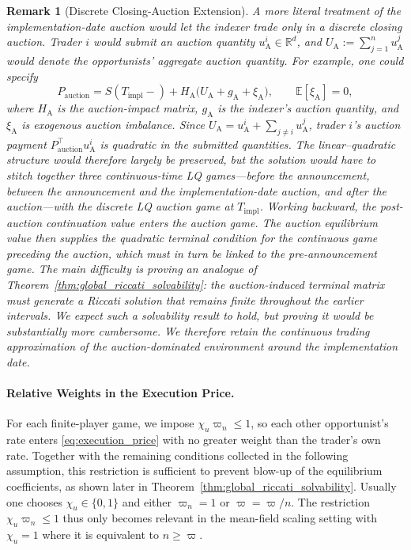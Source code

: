 \documentclass[12pt]{article}
\numberwithin{equation}{section}
\newtheorem{remark}[theorem]{Remark}
\theoremstyle{definition}
\begin{document}
\begin{remark}[Discrete Closing-Auction Extension]
\label{rem:discrete_closing_auction}
A more literal treatment of the implementation-date auction would let the indexer
trade only in a discrete closing auction. Trader \(i\) would submit an auction
quantity \(u_{\mathrm A}^i\in\mathbb R^d\), and
\(U_{\mathrm A}:=\sum_{j=1}^n u_{\mathrm A}^j\) would denote the
opportunists' aggregate auction quantity. For example, one could specify
\[
P_{\mathrm{auction}}
=
S(T_{\mathrm{impl}}-)
+
H_{\mathrm A}
\bigl(
U_{\mathrm A}+g_{\mathrm A}+\xi_{\mathrm A}
\bigr),
\qquad
\mathbb E[\xi_{\mathrm A}]=0,
\]
where \(H_{\mathrm A}\) is the auction-impact matrix,
\(g_{\mathrm A}\) is the indexer's auction quantity, and
\(\xi_{\mathrm A}\) is exogenous auction imbalance. Since
\(U_{\mathrm A}=u_{\mathrm A}^i+\sum_{j\ne i}u_{\mathrm A}^j\), trader
\(i\)'s auction payment \(P_{\mathrm{auction}}^\top u_{\mathrm A}^i\) is
quadratic in the submitted quantities. The linear--quadratic structure would
therefore largely be preserved, but the solution would have to stitch together
three continuous-time LQ games---before the announcement, between the
announcement and the implementation-date auction, and after the auction---with the
discrete LQ auction game at \(T_{\mathrm{impl}}\). Working backward, the
post-auction continuation value enters the auction game. The auction equilibrium
value then supplies the quadratic terminal condition for the continuous game
preceding the auction, which must in turn be linked to the pre-announcement
game. The main difficulty is proving an analogue of
Theorem~\ref{thm:global_riccati_solvability}: the auction-induced terminal
matrix must generate a Riccati solution that remains finite throughout the
earlier intervals. We expect such a solvability result to hold, but proving it
would be substantially more cumbersome. We therefore retain the continuous
trading approximation of the auction-dominated environment around the
implementation date.
\end{remark}

\paragraph{Relative Weights in the Execution Price.}
For each finite-player game, we impose $\chi_u\varpi_n\leq1$, so each other
opportunist's rate enters \eqref{eq:execution_price} with no greater weight
than the trader's own rate. Together with the remaining conditions collected
in the following assumption, this restriction is sufficient to prevent
blow-up of the equilibrium coefficients, as shown later in
Theorem~\ref{thm:global_riccati_solvability}. Usually one chooses \(\chi_u\in\{0, 1\}\)
and either \(\varpi_n=1\) or \(\varpi=\varpi/n\). The restriction \(\chi_u\varpi_n\leq1\)
thus only becomes relevant in the mean-field scaling setting with \(\chi_u=1\) where it is equivalent to
\(n\geq\varpi\).
\end{document}
